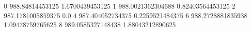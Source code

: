 0 988.84814453125 1.6700439453125
1 988.0021362304688 0.82403564453125
2 987.1781005859375 0.0
4 987.404052734375 0.2259521484375
6 988.2728881835938 1.09478759765625
8 989.0585327148438 1.88043212890625
